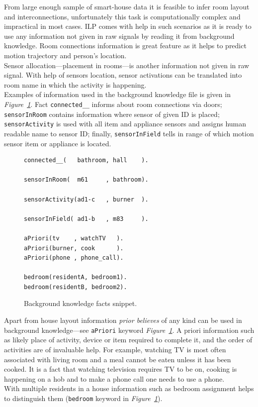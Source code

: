 \documentclass[12pt, a4paper, pdflatex, leqno, twoside, openright]{report}
\begin{document}
From large enough sample of smart-house data it is feasible to infer room layout and interconnections, unfortunately this task is computationally complex and impractical in most cases. ILP comes with help in such scenarios as it is ready to use any information not given in raw signals by reading it from background knowledge. Room connections information is great feature as it helps to predict motion trajectory and person's location.\\
Sensor allocation---placement in rooms---is another information not given in raw signal. With help of sensors location, sensor activations can be translated into room name in which the activity is happening.\\
Examples of information used in the background knowledge file is given in \emph{Figure~\ref{lst:bg}}. Fact \texttt{connected\_\_} informs about room connections via doors; \texttt{sensorInRoom} contains information where sensor of given ID is placed; \texttt{sensorActivity} is used with all item and appliance sensors and assigns human readable name to sensor ID; finally, \texttt{sensorInField} tells in range of which motion sensor item or appliance is located.\\

\begin{figure}[htb] %
  \begin{verbatim}
connected__(   bathroom, hall    ).

sensorInRoom(  m61     , bathroom).

sensorActivity(ad1-c   , burner  ).

sensorInField( ad1-b   , m83     ).

aPriori(tv    , watchTV   ).
aPriori(burner, cook      ).
aPriori(phone , phone_call).

bedroom(residentA, bedroom1).
bedroom(residentB, bedroom2).
  \end{verbatim}
  \caption{Background knowledge facts snippet.\label{lst:bg}}
\end{figure}

Apart from house layout information \emph{prior believes} of any kind can be used in background knowledge---see \texttt{aPriori} keyword \emph{Figure~\ref{lst:bg}}. A priori information such as likely place of activity, device or item required to complete it, and the order of activities are of invaluable help. For example, watching TV is most often associated with living room and a meal cannot be eaten unless it has been cooked. It is a fact that watching television requires TV to be on, cooking is happening on a hob and to make a phone call one needs to use a phone.\\
With multiple residents in a house information such as bedroom assignment helps to distinguish them (\texttt{bedroom} keyword in \emph{Figure~\ref{lst:bg}}).\\
\end{document}
